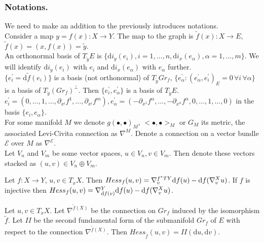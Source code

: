 \documentclass{llncs}
\newcommand{\partderiv}[2]{\partial_{#2} {#1}}
\newcommand{\CovariantDiffManif}[1]{\nabla^{#1}}
\newcommand{\CovariantDerivManif}[2]{\tensor*{\nabla}{^{#1}_{#2}}}
\newcommand{\Diff}{\mathrm{d}}
\newcommand{\TangentBundle}[1]{T{#1}}
\newcommand {\Preimage}[2]{{#2}^*{#1}}
\newcommand \TPreimage[2]{\Preimage{\TangentBundle{#1}}{#2}}
\newcommand {\bigeps}{\mathcal{E}}
\begin{document}
\subsubsection{Notations.}
We need to make an addition to the previously introduces notations.
\\
Consider a map $y = f(x):X\to Y$. The map to the graph is
$\tilde{f}(x):X \to E$, $\tilde{f}(x)=(x,f(x))=\tilde{y}$.
\\
An orthonormal basis of $T_{\tilde{y}} E$ is $\{\Diff i_y(e_i), i=1,\dots,n, 
\Diff i_x(e_\alpha),\alpha=1,\dots,m\}$. We will identify $\Diff i_y(e_i)$ with $e_i$ and $\Diff i_x(e_\alpha)$ with $e_\alpha$ further. 
\\
$\{e_i^{'}=\Diff \tilde{f}(e_i)\}$ is a basis (not orthonormal) of $T_{\tilde{y}} Gr_f$, 
$\{e_\alpha^{'}: (e_\alpha^{'},e_i^{'})_{E} = 0 \,\forall i \, \forall \alpha \}$ is a basis of $T_{\tilde{y}} (Gr_f)^{\bot}$. Then $\{e_i^{'}, e_\alpha^{'}\}$ is a basis of $T_{\tilde{y}} E$. 
\\
$e_i^{'} = (0,\dots,1, \dots, \partderiv{f^1}{x^i}, \dots, \partderiv{f^m}{x^i}), 
e_{\alpha}^{'}=(-\partderiv{f^{\alpha}}{x^1}, \dots, -\partderiv{f^{\alpha}}{x^n}, 0,\dots,1, \dots,0)$ in the basis $\{e_i, e_\alpha\}$.
\\
For some manifold $M$ we denote $g(∙,∙)_{M}$, $<∙,∙>_{M}$ or $G_M$ its metric, the associated Levi-Civita connection as $\CovariantDiffManif{M}$. Denote a connection on a vector bundle $\bigeps$ over $M$ as $\CovariantDiffManif{\bigeps}$. 
\\
Let $V_n$ and $V_m$ be some vector spaces, $u \in V_n, v \in V_m$. Then denote these vectors stacked as $(u,v) \in V_n\oplus V_m$.

\begin{proposition} \label{PropHessian}
Let $f:X\to Y$, $u, v\in T_x X$. Then
$Hess_f(u,v)=\CovariantDerivManif{\TPreimage{Y}{f}} {v} \Diff f(u) - 
							\Diff f( 
							\CovariantDerivManif{X}{v}u
							)$.
							If $f$ is injective then 
							$Hess_f(u,v)=\CovariantDerivManif{Y}{ \Diff f(v)} \Diff f(u) - 
							\Diff f( 
							\CovariantDerivManif{X}{v}u
							)$.
\end{proposition}

\begin{lemma}  \label{LemSecondFormHessian}
Let $u, v \in T_xX$. Let $\CovariantDiffManif{\tilde{f}(X)}$ be the connection on $Gr_f$ induced by the isomorphism $\tilde{f}$. Let $II$ be the second fundamental form of the submanifold $Gr_f$ of $E$ with respect to the connection $\CovariantDiffManif{\tilde{f}(X)}$. Then 
$Hess_{\tilde{f}}(u, v) = II(\Diff u, \Diff v)$.
\end{lemma}
\end{document}
